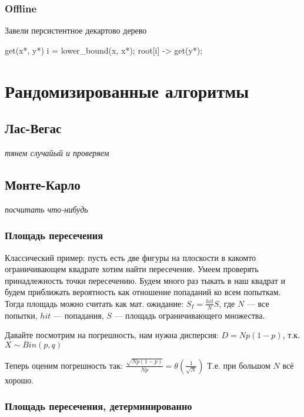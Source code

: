\subsection{Offline}

Завели персистентное декартово дерево

\begin{cppcode}
    get(x*, y*)
    i = lower\_bound(x, x*);
    root[i] -> get(y*);
\end{cppcode}


\chapter{Рандомизированные алгоритмы}

\section{Лас-Вегас}

\textit{тянем случайый и проверяем}


\section{Монте-Карло}

\textit{посчитать что-нибудь}

\subsection{Площадь пересечения}

Классический пример: пусть есть две фигуры на плоскости в какомто ограничивающем квадрате
хотим найти пересечение. Умеем проверять принадлежность точки пересечению.
Будем много раз тыкать в наш квадрат и будем приближать вероятность как отношение
попаданий ко всем попыткам. Тогда площадь можно считать как мат. ожидание:
$S_I = \frac{hit}{N} S$, где $N$ --- все попытки, $hit$ --- попадания, $S$ --- площадь 
ограничивающего множества.

Давайте посмотрим на погрешность, нам нужна дисперсия: $D = Np(1-p)$, т.к. $X\sim Bin(p, q)$

Теперь оценим погрешность так: $\frac{\sqrt{Np(1-p)}}{Np} = \theta(\frac{1}{\sqrt{N}})$
Т.е. при большом $N$ всё хорошо.

\subsection{Площадь пересечения, детерминированно}

